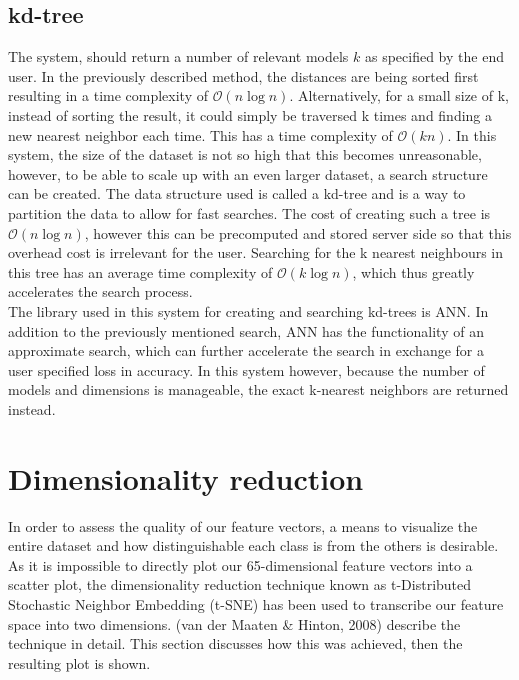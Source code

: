 \documentclass{bigdata}
\begin{document}
\subsection{kd-tree}
The system, should return a number of relevant models $k$ as specified by the end user. In the previously described method, the distances are being sorted first resulting in a time complexity of $\mathcal{O}(n\log{}n)$. Alternatively, for a small size of k, instead of sorting the result, it could simply be traversed k times and finding a new nearest neighbor each time. This has a time complexity of $\mathcal{O}(kn)$. In this system, the size of the dataset is not so high that this becomes unreasonable, however, to be able to scale up with an even larger dataset, a search structure can be created. The data structure used is called a kd-tree and is a way to partition the data to allow for fast searches. The cost of creating such a tree is $\mathcal{O}(n\log{}n)$, however this can be precomputed and stored server side so that this overhead cost is irrelevant for the user. Searching for the k nearest neighbours in this tree has an average time complexity of $\mathcal{O}(k\log{}n)$, which thus greatly accelerates the search process. \\
The library used in this system for creating and searching kd-trees is ANN. In addition to the previously mentioned search, ANN has the functionality of an approximate search, which can further accelerate the search in exchange for a user specified loss in accuracy. In this system however, because the number of models and dimensions is manageable, the exact k-nearest neighbors are returned instead. 

\section{Dimensionality reduction}
In order to assess the quality of our feature vectors, a means to visualize the entire dataset and how distinguishable each class is from the others is desirable. As it is impossible to directly plot our 65-dimensional feature vectors into a scatter plot, the dimensionality reduction technique known as t-Distributed Stochastic Neighbor Embedding (t-SNE) has been used to transcribe our feature space into two dimensions. (van der Maaten \& Hinton, 2008) describe the technique in detail. This section discusses how this was achieved, then the resulting plot is shown. 
\end{document}
